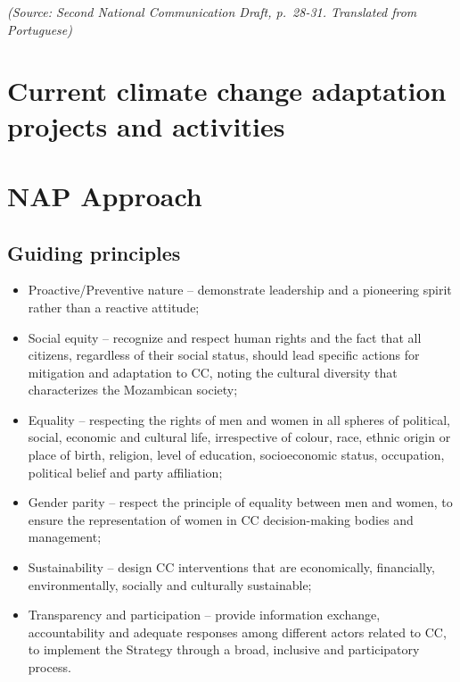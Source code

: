 \documentclass[
]{book}
\providecommand{\tightlist}{%
  \setlength{\itemsep}{0pt}\setlength{\parskip}{0pt}}
\begin{document}
\emph{(Source: Second National Communication Draft, p.~28-31. Translated from Portuguese)}

\hypertarget{current-climate-change-adaptation-projects-and-activities}{%
\section{Current climate change adaptation projects and activities}\label{current-climate-change-adaptation-projects-and-activities}}

\hypertarget{nap-approach}{%
\section{NAP Approach}\label{nap-approach}}

\hypertarget{guiding-principles}{%
\subsection{Guiding principles}\label{guiding-principles}}

\begin{itemize}
\tightlist
\item
  Proactive/Preventive nature -- demonstrate leadership and a pioneering spirit rather than a reactive attitude;
\item
  Social equity -- recognize and respect human rights and the fact that all citizens, regardless of their social status, should lead specific actions for mitigation and adaptation to CC, noting the cultural diversity that characterizes the Mozambican society;
\item
  Equality -- respecting the rights of men and women in all spheres of political, social, economic and cultural life, irrespective of colour, race, ethnic origin or place of birth, religion, level of education, socioeconomic status, occupation, political belief and party affiliation;
\item
  Gender parity -- respect the principle of equality between men and women, to ensure the representation of women in CC decision-making bodies and management;
\item
  Sustainability -- design CC interventions that are economically, financially, environmentally, socially and culturally sustainable;
\item
  Transparency and participation -- provide information exchange, accountability and adequate responses among different actors related to CC, to implement the Strategy through a broad, inclusive and participatory process.
\end{itemize}
\end{document}

